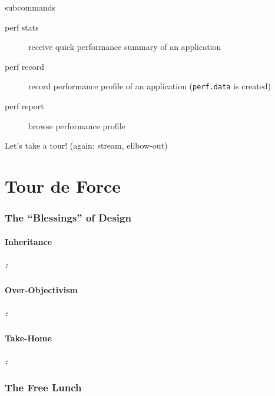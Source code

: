 \documentclass[9pt,xcolor=table]{beamer}
\begin{document}
\begin{frame}
\begin{columns}[t]
\begin{column}{.3\textwidth}
    \end{column}
  \end{columns}
  \pause
  \begin{block}{subcommands}
    \begin{description}
    \item[perf stats] receive quick performance summary of an application
    \item[perf record] record performance profile of an application (\texttt{perf.data} is created)
    \item[perf report] browse performance profile  
      \end{description}
    \pause
    \begin{center}
      \alert{Let's take a tour!} (again: stream, ellbow-out)
    \end{center}
  \end{block}

\end{frame}


\part{Tour de Force}
\section{The ``Blessings'' of Design}
\subsection{Inheritance}
\begin{frame}
\frametitle{\insertsectionhead{}: \insertsubsectionhead{}}
\end{frame}

\subsection{Over-Objectivism}
\begin{frame}
\frametitle{\insertsectionhead{}: \insertsubsectionhead{}}
\end{frame}

\subsection{Take-Home}
\begin{frame}
\frametitle{\insertsectionhead{}: \insertsubsectionhead{}}
\end{frame}

\section{The Free Lunch}
\end{document}
